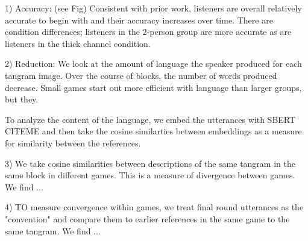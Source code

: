 \documentclass[11pt,a4paper]{article}
\begin{document}
1) Accuracy: (see Fig) Consistent with prior work, listeners are overall relatively accurate to begin with and their accuracy increases over time. There are condition differences; listeners in the 2-person group are more accurate as are listeners in the thick channel condition. 

2) Reduction: We look at the amount of language the speaker produced for each tangram image. Over the course of blocks, the number of words produced decrease. Small games start out more efficient with language than larger groups, but they.

To analyze the content of the language, we embed the utterances with SBERT CITEME and then take the cosine similarties between embeddings as a measure for similarity between the references. 

3) We take cosine similarities between descriptions of the same tangram in the same block in different games. This is a measure of divergence between games. We find ...

4) TO measure convergence within games, we treat final round utterances as the "convention" and compare them to earlier references in the same game to the same tangram. We find ...


\newpage
\end{document}

